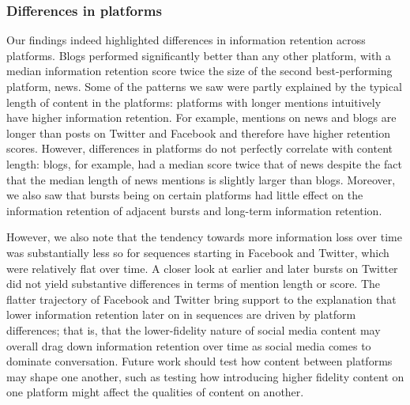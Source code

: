 \documentclass[letterpaper]{article} %
\begin{document}
\subsubsection{Differences in platforms}
Our findings indeed highlighted differences in information retention across platforms. Blogs performed significantly better than any other platform, with a median information retention score twice the size of the second best-performing platform, news. Some of the patterns we saw were partly explained by the typical length of content in the platforms: platforms with longer mentions intuitively have higher information retention. For example, mentions on news and blogs are longer than posts on Twitter and Facebook and therefore have higher retention scores. However, differences in platforms do not perfectly correlate with content length: blogs, for example, had a median score twice that of news despite the fact that the median length of news mentions is slightly larger than blogs. Moreover, we also saw that bursts being on certain platforms had little effect on the information retention of adjacent bursts and long-term information retention.

However, we also note that the tendency towards more information loss over time was substantially less so for sequences starting in Facebook and Twitter, which were relatively flat over time. A closer look at earlier and later bursts on Twitter did not yield substantive differences in terms of mention length or score. The flatter trajectory of Facebook and Twitter bring support to the explanation that lower information retention later on in sequences are driven by platform differences; that is, that the lower-fidelity nature of social media content may overall drag down information retention over time as social media comes to dominate conversation. Future work should test how content between platforms may shape one another, such as testing how introducing higher fidelity content on one platform might affect the qualities of content on another.

\end{document}
